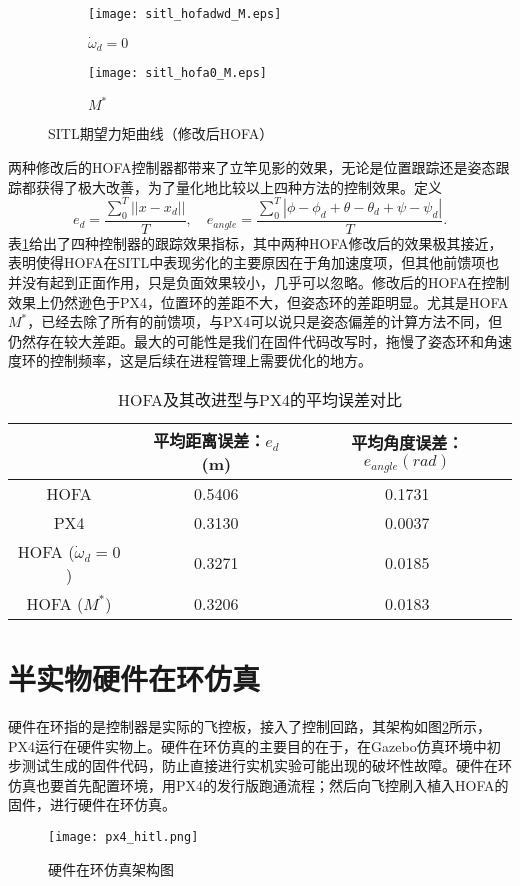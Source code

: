 \begin{figure}[H]
  \centering
\begin{subfigure}[b]{0.49\linewidth}
    \texttt{[image: sitl\_hofadwd\_M.eps]}
    \caption{$\dot \omega_d =0$}
\end{subfigure}
\hfill
\begin{subfigure}[b]{0.49\linewidth}
    \texttt{[image: sitl\_hofa0\_M.eps]}
    \caption{$M^*$}
\end{subfigure}
\caption{SITL期望力矩曲线（修改后HOFA）}
\label{SITL期望力矩曲线:HOFA改进}
\end{figure}

两种修改后的HOFA控制器都带来了立竿见影的效果，无论是位置跟踪还是姿态跟踪都获得了极大改善，为了量化地比较以上四种方法的控制效果。定义
$$e_d=\frac{\sum_0^{T}||x-x_d||}{T} ,\quad e_{angle}=\frac{\sum_0^{T}|\phi-\phi_d+\theta-\theta_d+\psi-\psi_d|}{T}.$$
表\ref{HOFA改}给出了四种控制器的跟踪效果指标，其中两种HOFA修改后的效果极其接近，表明使得HOFA在SITL中表现劣化的主要原因在于角加速度项，但其他前馈项也并没有起到正面作用，只是负面效果较小，几乎可以忽略。修改后的HOFA在控制效果上仍然逊色于PX4，位置环的差距不大，但姿态环的差距明显。尤其是HOFA$M^*$，已经去除了所有的前馈项，与PX4可以说只是姿态偏差的计算方法不同，但仍然存在较大差距。最大的可能性是我们在固件代码改写时，拖慢了姿态环和角速度环的控制频率，这是后续在进程管理上需要优化的地方。
\begin{table}[H]
  \centering
  \caption{HOFA及其改进型与PX4的平均误差对比}
  \label{HOFA改}
  \begin{tabular}{ccc}
      \toprule
      & 平均距离误差：$e_d$ (m)& 平均角度误差：$e_{angle}(rad)$  \\
      \midrule
      HOFA &0.5406  & 0.1731\\
      PX4 & 0.3130 &  0.0037\\
      HOFA ($\dot \omega_d=0$) & 0.3271 & 0.0185\\
      HOFA ($M^*$) &0.3206  & 0.0183\\
      \bottomrule
  \end{tabular}
\end{table}

\section{半实物硬件在环仿真}
硬件在环指的是控制器是实际的飞控板，接入了控制回路，其架构如图\ref{hitl架构}所示，PX4运行在硬件实物上。硬件在环仿真的主要目的在于，在Gazebo仿真环境中初步测试生成的固件代码，防止直接进行实机实验可能出现的破坏性故障。硬件在环仿真也要首先配置环境，用PX4的发行版跑通流程；然后向飞控刷入植入HOFA的固件，进行硬件在环仿真。
\begin{figure}[!h]
  \centering
  \texttt{[image: px4\_hitl.png]}
  \caption{硬件在环仿真架构图\protect\footnotemark[1]}
  \label{hitl架构}
\end{figure}
